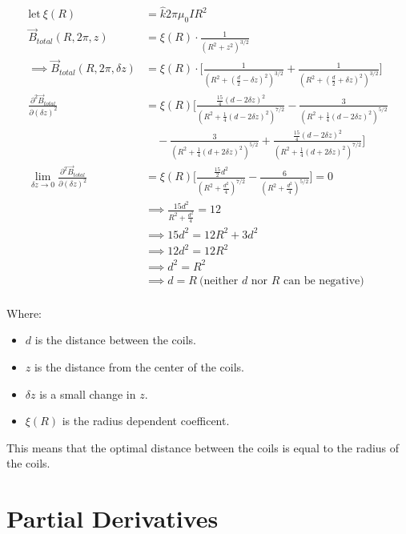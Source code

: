 \begin{align*}
    \text{let}~\xi(R) &= \hat{k}2\pi \mu_0 I R^2 \\
    \vec{B}_{total}(R, 2\pi, z) &= \xi(R) \cdot \frac{1}{(R^{2}+z^{2})^{3/2}} \\
    \implies \vec{B}_{total}(R, 2\pi, \delta z) &= \xi(R) \cdot \bigg[\frac{1}{(R^{2}+(\frac{d}{2}-\delta z)^{2})^{3/2}} + \frac{1}{(R^{2}+(\frac{d}{2}+\delta z)^{2})^{3/2}}\bigg] \\ 
    \frac{\partial^{2} \vec{B}_{total}}{\partial (\delta z)^{2}} &= \xi(R) \bigg[\frac{\frac{15}{4}(d-2\delta z)^{2}}{(R^{2}+\frac{1}{4}(d-2\delta z)^{2})^{7/2}}-\frac{3}{(R^{2}+\frac{1}{4}(d-2\delta z)^{2})^{5/2}} \\ 
    &\quad -\frac{3}{(R^{2}+\frac{1}{4}(d+2\delta z)^{2})^{5/2}}+\frac{\frac{15}{4}(d-2\delta z)^{2}}{(R^{2}+\frac{1}{4}(d+2\delta z)^{2})^{7/2}}\bigg] \\ 
    \lim_{\delta z \to 0} \frac{\partial^{2} \vec{B}_{total}}{\partial (\delta z)^{2}} &= \xi(R) \bigg[\frac{\frac{15}{2}d^{2}}{(R^{2}+\frac{d^{2}}{4})^{7/2}}-\frac{6}{(R^{2}+\frac{d^{2}}{4})^{5/2}}\bigg] = 0 \\ 
    &\implies \frac{15d^{2}}{R^2+\frac{d^{2}}{4}} = 12 \\
    &\implies 15d^{2} = 12R^{2} + 3d^{2} \\
    &\implies 12d^{2} = 12R^{2} \\
    &\implies d^{2} = R^{2} \\
    &\implies d = R ~ \text{(neither $d$ nor $R$ can be negative)} \\
\end{align*}

\noindent Where:

\begin{itemize}
    \item \( d \) is the distance between the coils.
    \item \( z \) is the distance from the center of the coils.
    \item \( \delta z \) is a small change in \( z \).
    \item \( \xi(R) \) is the radius dependent coefficent.
\end{itemize}

This means that the optimal distance between the coils is equal to the radius of the coils.

\newpage{}
\thispagestyle{plain}

\section{Partial Derivatives}

